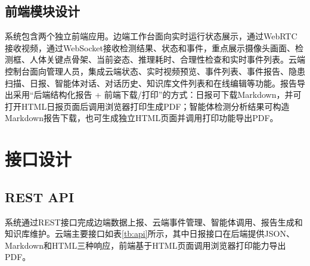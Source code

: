 \subsection{前端模块设计}

系统包含两个独立前端应用。边端工作台面向实时运行状态展示，通过WebRTC接收视频，通过WebSocket接收检测结果、状态和事件，重点展示摄像头画面、检测框、人体关键点骨架、当前姿态、推理耗时、合理性检查和实时事件列表。云端控制台面向管理人员，集成云端状态、实时视频预览、事件列表、事件报告、隐患扫描、日报、智能体对话、对话历史、知识库文件列表和在线编辑等功能。报告导出采用“后端结构化报告 + 前端下载/打印”的方式：日报可下载Markdown，并可打开HTML日报页面后调用浏览器打印生成PDF；智能体检测分析结果可构造Markdown报告下载，也可生成独立HTML页面并调用打印功能导出PDF。

\section{接口设计}

\subsection{REST API}

系统通过REST接口完成边端数据上报、云端事件管理、智能体调用、报告生成和知识库维护。云端主要接口如表\ref{tb:api}所示，其中日报接口在后端提供JSON、Markdown和HTML三种响应，前端基于HTML页面调用浏览器打印能力导出PDF。

